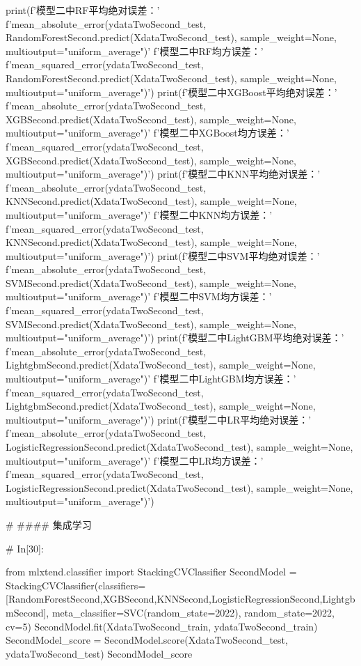 \documentclass{MathorCupmodeling}
\begin{document}
\begin{python}
print(f'模型二中RF平均绝对误差：'
      f'{mean_absolute_error(ydataTwoSecond_test, RandomForestSecond.predict(XdataTwoSecond_test), sample_weight=None, multioutput="uniform_average")}\n'
      f'模型二中RF均方误差：'
      f'{mean_squared_error(ydataTwoSecond_test, RandomForestSecond.predict(XdataTwoSecond_test), sample_weight=None, multioutput="uniform_average")}')
print(f'模型二中XGBoost平均绝对误差：'
      f'{mean_absolute_error(ydataTwoSecond_test, XGBSecond.predict(XdataTwoSecond_test), sample_weight=None, multioutput="uniform_average")}\n'
      f'模型二中XGBoost均方误差：'
      f'{mean_squared_error(ydataTwoSecond_test, XGBSecond.predict(XdataTwoSecond_test), sample_weight=None, multioutput="uniform_average")}')
print(f'模型二中KNN平均绝对误差：'
      f'{mean_absolute_error(ydataTwoSecond_test, KNNSecond.predict(XdataTwoSecond_test), sample_weight=None, multioutput="uniform_average")}\n'
      f'模型二中KNN均方误差：'
      f'{mean_squared_error(ydataTwoSecond_test, KNNSecond.predict(XdataTwoSecond_test), sample_weight=None, multioutput="uniform_average")}')
print(f'模型二中SVM平均绝对误差：'
      f'{mean_absolute_error(ydataTwoSecond_test, SVMSecond.predict(XdataTwoSecond_test), sample_weight=None, multioutput="uniform_average")}\n'
      f'模型二中SVM均方误差：'
      f'{mean_squared_error(ydataTwoSecond_test, SVMSecond.predict(XdataTwoSecond_test), sample_weight=None, multioutput="uniform_average")}')
print(f'模型二中LightGBM平均绝对误差：'
      f'{mean_absolute_error(ydataTwoSecond_test, LightgbmSecond.predict(XdataTwoSecond_test), sample_weight=None, multioutput="uniform_average")}\n'
      f'模型二中LightGBM均方误差：'
      f'{mean_squared_error(ydataTwoSecond_test, LightgbmSecond.predict(XdataTwoSecond_test), sample_weight=None, multioutput="uniform_average")}')
print(f'模型二中LR平均绝对误差：'
      f'{mean_absolute_error(ydataTwoSecond_test, LogisticRegressionSecond.predict(XdataTwoSecond_test), sample_weight=None, multioutput="uniform_average")}\n'
      f'模型二中LR均方误差：'
      f'{mean_squared_error(ydataTwoSecond_test, LogisticRegressionSecond.predict(XdataTwoSecond_test), sample_weight=None, multioutput="uniform_average")}')


# #### 集成学习

# In[30]:


from mlxtend.classifier import StackingCVClassifier
SecondModel = StackingCVClassifier(classifiers=[RandomForestSecond,XGBSecond,KNNSecond,LogisticRegressionSecond,LightgbmSecond], meta_classifier=SVC(random_state=2022), random_state=2022, cv=5)
SecondModel.fit(XdataTwoSecond_train, ydataTwoSecond_train)
SecondModel_score = SecondModel.score(XdataTwoSecond_test, ydataTwoSecond_test)
SecondModel_score



\end{python}
\end{document}
